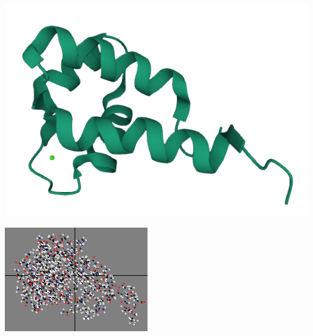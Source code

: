 \documentclass[10pt]{beamer}
\theoremstyle{plain}
\theoremstyle{definition}
\begin{document}
\begin{frame}
{			\begin{center}
				\begin{minipage}{0.08\linewidth}
					\hspace{0.1cm}
				\end{minipage}	
				\begin{minipage}{0.4\linewidth}
					\includegraphics[width=0.8\linewidth]{prot2.png}
				\end{minipage}
				\begin{minipage}{0.08\linewidth}
					\hspace{0.5cm}
				\end{minipage}
				\begin{minipage}{0.4\linewidth}
					\includegraphics[width=0.7\linewidth]{prot.png}
				\end{minipage}
			\end{center}
		}	
	\end{frame}
\end{document}
